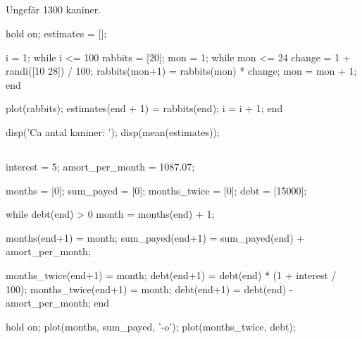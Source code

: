 


\subsection*{}
Ungefär 1300 kaniner.
\vspace{10pt}
\begin{matlab}
hold on;
estimates = [];

i = 1;
while i <= 100
	rabbits = [20]; %
	mon = 1;
	while mon <= 24
		change = 1 + randi([10 28]) / 100;
		rabbits(mon+1) = rabbits(mon) * change;
		mon = mon + 1;
	end

	plot(rabbits);
	estimates(end + 1) = rabbits(end);
	i = i + 1;
end

disp('Ca antal kaniner: ');
disp(mean(estimates));
\end{matlab}


\subsection*{}
\vspace{3pt}
\begin{matlab}
interest = 5; %
amort_per_month = 1087.07;

months = [0];
sum_payed = [0];
months_twice = [0];
debt = [15000];

while debt(end) > 0
  month = months(end) + 1;

  months(end+1) = month;
  sum_payed(end+1) = sum_payed(end) + amort_per_month;

  months_twice(end+1) = month;
  debt(end+1) = debt(end) * (1 + interest / 100);
  months_twice(end+1) = month;
  debt(end+1) = debt(end) - amort_per_month;
end

hold on;
plot(months, sum_payed, '-o');
plot(months_twice, debt);
\end{matlab}

